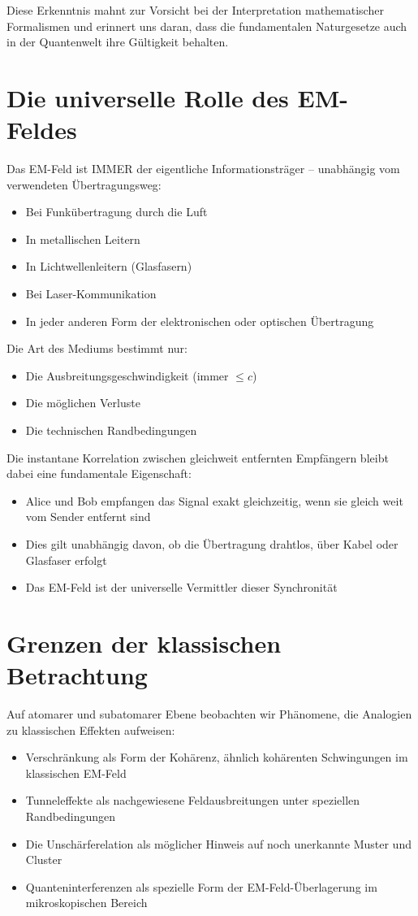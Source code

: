 \documentclass[12pt,a4paper]{article}
\begin{document}
	Diese Erkenntnis mahnt zur Vorsicht bei der Interpretation mathematischer Formalismen und erinnert uns daran, dass die fundamentalen Naturgesetze auch in der Quantenwelt ihre Gültigkeit behalten.
	
	\section{Die universelle Rolle des EM-Feldes}
	Das EM-Feld ist IMMER der eigentliche Informationsträger -- unabhängig vom verwendeten Übertragungsweg:
	\begin{itemize}
		\item Bei Funkübertragung durch die Luft
		\item In metallischen Leitern
		\item In Lichtwellenleitern (Glasfasern)
		\item Bei Laser-Kommunikation
		\item In jeder anderen Form der elektronischen oder optischen Übertragung
	\end{itemize}
	
	Die Art des Mediums bestimmt nur:
	\begin{itemize}
		\item Die Ausbreitungsgeschwindigkeit (immer $\leq c$)
		\item Die möglichen Verluste
		\item Die technischen Randbedingungen
	\end{itemize}
	
	Die instantane Korrelation zwischen gleichweit entfernten Empfängern bleibt dabei eine fundamentale Eigenschaft:
	\begin{itemize}
		\item Alice und Bob empfangen das Signal exakt gleichzeitig, wenn sie gleich weit vom Sender entfernt sind
		\item Dies gilt unabhängig davon, ob die Übertragung drahtlos, über Kabel oder Glasfaser erfolgt
		\item Das EM-Feld ist der universelle Vermittler dieser Synchronität
	\end{itemize}
	
	\section{Grenzen der klassischen Betrachtung}
	Auf atomarer und subatomarer Ebene beobachten wir Phänomene, die Analogien zu klassischen Effekten aufweisen:
	\begin{itemize}
		\item Verschränkung als Form der Kohärenz, ähnlich kohärenten Schwingungen im klassischen EM-Feld
		\item Tunneleffekte als nachgewiesene Feldausbreitungen unter speziellen Randbedingungen
		\item Die Unschärferelation als möglicher Hinweis auf noch unerkannte Muster und Cluster
		\item Quanteninterferenzen als spezielle Form der EM-Feld-Überlagerung im mikroskopischen Bereich
	\end{itemize}
	
\end{document}
